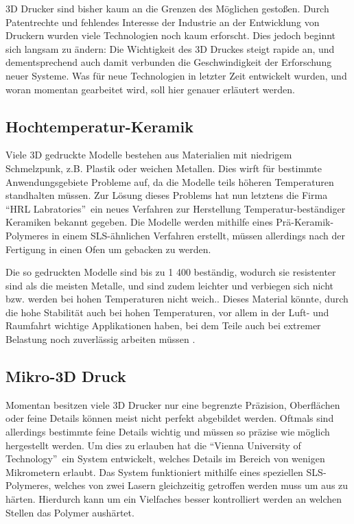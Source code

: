 3D Drucker sind bisher kaum an die Grenzen des Möglichen gestoßen. Durch Patentrechte und fehlendes Interesse der Industrie an der Entwicklung von Druckern wurden viele Technologien noch kaum erforscht. Dies jedoch beginnt sich langsam zu ändern: Die Wichtigkeit des 3D Druckes steigt rapide an, und dementsprechend auch damit verbunden die Geschwindigkeit der Erforschung neuer Systeme. Was für neue Technologien in letzter Zeit entwickelt wurden, und woran momentan gearbeitet wird, soll hier genauer erläutert werden.

\subsection{Hochtemperatur-Keramik}
Viele 3D gedruckte Modelle bestehen aus Materialien mit niedrigem Schmelzpunk, z.B. Plastik oder weichen Metallen. Dies wirft für bestimmte Anwendungsgebiete Probleme auf, da die Modelle teils höheren Temperaturen standhalten müssen. Zur Lösung dieses Problems hat nun letztens die Firma \textquotedblleft HRL Labratories\textquotedblright ~ein neues Verfahren zur Herstellung Temperatur-beständiger Keramiken bekannt gegeben. Die Modelle werden mithilfe eines Prä-Keramik-Polymeres in einem SLS-ähnlichen Verfahren erstellt, müssen allerdings nach der Fertigung in einen Ofen um gebacken zu werden.

Die so gedruckten Modelle sind bis zu 1 400 \TEMP beständig, wodurch sie resistenter sind als die meisten Metalle, und sind zudem leichter und verbiegen sich nicht bzw. werden bei hohen Temperaturen nicht weich.. 
Dieses Material könnte, durch die hohe Stabilität auch bei hohen Temperaturen, vor allem in der Luft- und Raumfahrt wichtige Applikationen haben, bei dem Teile auch bei extremer Belastung noch zuverlässig arbeiten müssen \parencite{HiTempCeram}.

\subsection{Mikro-3D Druck}
Momentan besitzen viele 3D Drucker nur eine begrenzte Präzision, Oberflächen oder feine Details können meist nicht perfekt abgebildet werden. Oftmals sind allerdings bestimmte feine Details wichtig und müssen so präzise wie möglich hergestellt werden. Um dies zu erlauben hat die \textquotedblleft Vienna University of Technology\textquotedblright ~ein System entwickelt, welches Details im Bereich von wenigen Mikrometern erlaubt.
Das System funktioniert mithilfe eines speziellen SLS-Polymeres, welches von zwei Lasern gleichzeitig getroffen werden muss um aus zu härten. Hierdurch kann um ein Vielfaches besser kontrolliert werden an welchen Stellen das Polymer aushärtet.

